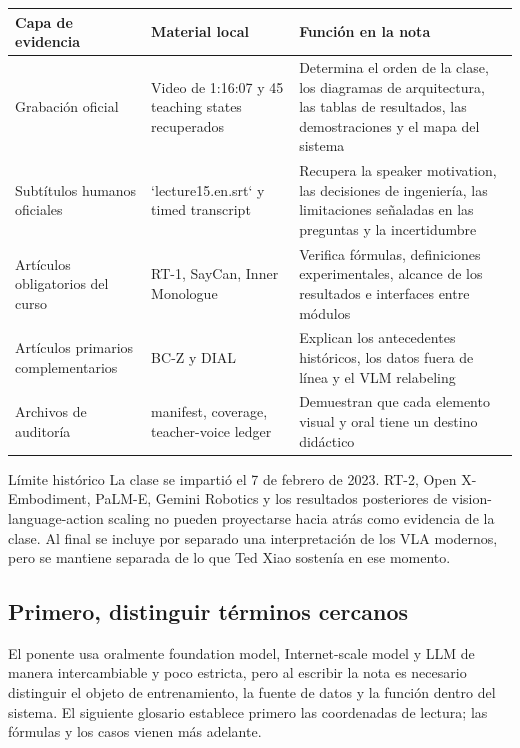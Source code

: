 \documentclass[a4paper]{article}
\begin{document}
\begin{longtable}{L{0.21\textwidth}L{0.31\textwidth}L{0.38\textwidth}}
\toprule
Capa de evidencia & Material local & Función en la nota \\
\midrule
Grabación oficial & Video de 1:16:07 y 45 teaching states recuperados & Determina el orden de la clase, los diagramas de arquitectura, las tablas de resultados, las demostraciones y el mapa del sistema \\
Subtítulos humanos oficiales & `lecture15.en.srt` y timed transcript & Recupera la speaker motivation, las decisiones de ingeniería, las limitaciones señaladas en las preguntas y la incertidumbre \\
Artículos obligatorios del curso & RT-1, SayCan, Inner Monologue & Verifica fórmulas, definiciones experimentales, alcance de los resultados e interfaces entre módulos \\
Artículos primarios complementarios & BC-Z y DIAL & Explican los antecedentes históricos, los datos fuera de línea y el VLM relabeling \\
Archivos de auditoría & manifest, coverage, teacher-voice ledger & Demuestran que cada elemento visual y oral tiene un destino didáctico \\
\bottomrule
\end{longtable}

\begin{warningbox}{Límite histórico}
La clase se impartió el 7 de febrero de 2023. RT-2, Open X-Embodiment, PaLM-E, Gemini Robotics y los resultados posteriores de vision-language-action scaling no pueden proyectarse hacia atrás como evidencia de la clase. Al final se incluye por separado una interpretación de los VLA modernos, pero se mantiene separada de lo que Ted Xiao sostenía en ese momento.
\end{warningbox}

\subsection{Primero, distinguir términos cercanos}

El ponente usa oralmente foundation model, Internet-scale model y LLM de manera intercambiable y poco estricta, pero al escribir la nota es necesario distinguir el objeto de entrenamiento, la fuente de datos y la función dentro del sistema. El siguiente glosario establece primero las coordenadas de lectura; las fórmulas y los casos vienen más adelante.
\end{document}
